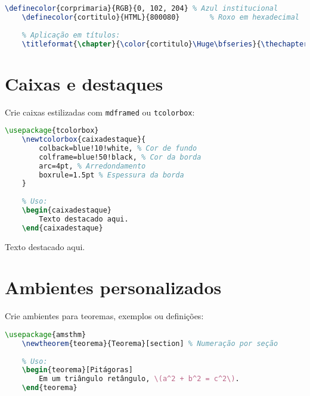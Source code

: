 \begin{lstlisting}[language=tex, caption=Alterando a cores de títulos e seções]
    \definecolor{corprimaria}{RGB}{0, 102, 204} % Azul institucional
    \definecolor{cortitulo}{HTML}{800080}       % Roxo em hexadecimal
    
    % Aplicação em títulos:
    \titleformat{\chapter}{\color{cortitulo}\Huge\bfseries}{\thechapter}{1em}{}
\end{lstlisting}

\section{Caixas e destaques}

Crie caixas estilizadas com \verb|mdframed| ou \verb|tcolorbox|:

\begin{lstlisting}[language=tex, caption=Exemplo de caixa de destaque]
    \usepackage{tcolorbox}
    \newtcolorbox{caixadestaque}{
        colback=blue!10!white, % Cor de fundo
        colframe=blue!50!black, % Cor da borda
        arc=4pt, % Arredondamento
        boxrule=1.5pt % Espessura da borda
    }
    
    % Uso:
    \begin{caixadestaque}
        Texto destacado aqui.
    \end{caixadestaque}
\end{lstlisting}


\begin{caixadestaque}
    Texto destacado aqui.
\end{caixadestaque}

\section{Ambientes personalizados}

Crie ambientes para teoremas, exemplos ou definições:

\begin{lstlisting}[language=tex, caption=Caixa de destaque simples para teorema]
    \usepackage{amsthm}
    \newtheorem{teorema}{Teorema}[section] % Numeração por seção
    
    % Uso:
    \begin{teorema}[Pitágoras]
        Em um triângulo retângulo, \(a^2 + b^2 = c^2\).
    \end{teorema}
\end{lstlisting}

